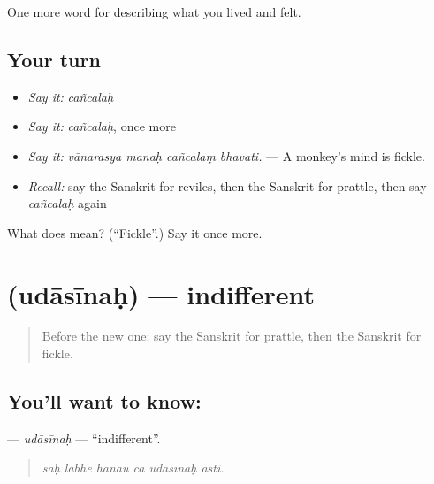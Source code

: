 \begin{grammarlens}[title={What you've built}]
One more word for describing what you lived and felt.
\end{grammarlens}

\subsection*{Your turn}
\begin{itemize}
\raggedright
  \item \emph{Say it:} \emph{cañcalaḥ}
  \item \emph{Say it:} \emph{cañcalaḥ}, once more
  \item \emph{Say it:} \emph{vānarasya manaḥ cañcalaṃ bhavati.} — A monkey's mind is fickle.
  \item \emph{Recall:} say the Sanskrit for reviles, then the Sanskrit for prattle, then say \emph{cañcalaḥ} again
\end{itemize}

\begin{tcolorbox}[breakable,colback=teal!4,colframe=teal!35!black,title={Before you move on}]
What does  mean? (\textquotedblleft{}Fickle\textquotedblright{}.) Say it once more.
\end{tcolorbox}
\section[\texorpdfstring{\sk{उदासीनः} (udāsīnaḥ)}{उदासीनः (udāsīnaḥ)}]{ (udāsīnaḥ) — indifferent}

\label{lesson:SA-C465-udasinah}



\begin{quote}
Before the new one: say the Sanskrit for prattle, then the Sanskrit for fickle.
\end{quote}

\subsection*{You'll want to know: }
\textbf{} — \emph{udāsīnaḥ} — \textquotedblleft{}indifferent\textquotedblright{}.

\begin{quote}
     
\end{quote}

\begin{quote}
\emph{saḥ lābhe hānau ca udāsīnaḥ asti.}
\end{quote}


